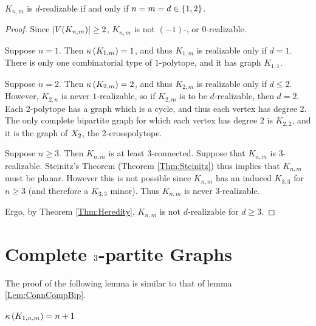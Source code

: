     \begin{Theorem}\label{Thm:CompBip}
        \(K_{n,m}\) is \(d\)-realizable if and only if \(n=m=d\in\left\{1,2\right\}\).
    \end{Theorem}
    \begin{proof}
        Since \(\left\lvert V(K_{n,m})\right\rvert\ge 2\), \(K_{n,m}\) is not \((-1)\)-, or \(0\)-realizable.

        Suppose \(n=1\).  Then \(\kappa\left(K_{1,m}\right)=1\), and thus \(K_{1,m}\) is realizable only if \(d=1\).  There is only one combinatorial type of \(1\)-polytope, and it has graph \(K_{1,1}\).

        Suppose \(n=2\).  Then \(\kappa\left(K_{2,m}\right)=2\), and thus \(K_{2,m}\) is realizable only if \(d\le2\).  However, \(K_{2,n}\) is never \(1\)-realizable, so if \(K_{2,m}\) is to be \(d\)-realizable, then \(d=2\).  Each \(2\)-polytope has a graph which is a cycle, and thus each vertex has degree \(2\).  The only complete bipartite graph for which each vertex has degree \(2\) is \(K_{2,2}\), and it is the graph of \(X_{2}\), the \(2\)-crosspolytope.

        Suppose \(n\ge3\).  Then \(K_{n,m}\) is  at least \(3\)-connected.  Suppose that \(K_{n,m}\) is \(3\)-realizable.  Steinitz's Theorem (Theorem \ref{Thm:Steinitz}) thus implies that \(K_{n,m}\) must be planar.  However this is not possible since \(K_{n,m}\) has an induced \(K_{3,3}\) for \(n\ge3\) (and therefore a \(K_{3,3}\) minor).  Thus \(K_{n,m}\) is never \(3\)-realizable.

        Ergo, by Theorem \ref{Thm:Heredity}, \(K_{n,m}\) is not \(d\)-realizable for \(d\ge3\).
    \end{proof}

\section{Complete \protect$3\protect$-partite Graphs}
    The proof of the following lemma is similar to that of lemma \ref{Lem:ConnCompBip}.
    \begin{Lemma}
        \(\kappa\left(K_{1,n,m}\right)=n+1\)
    \end{Lemma}

